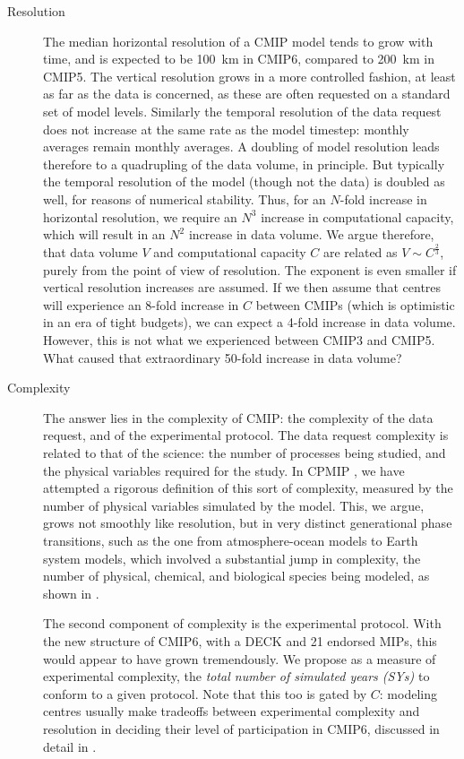 \documentclass[gmd,manuscript]{copernicus}
\newcommand{\bibref}[1] { \cite{ref:#1}}
\newcommand{\pipref}[1] {\citep{ref:#1}}
\begin{document}
\begin{description}
\item[Resolution] The median horizontal resolution of a CMIP model
  tends to grow with time, and is expected to be 100~km in CMIP6,
  compared to 200~km in CMIP5. The vertical resolution grows in a more
  controlled fashion, at least as far as the data is concerned, as
  these are often requested on a standard set of model levels.
  Similarly the temporal resolution of the data request does not
  increase at the same rate as the model timestep: monthly averages
  remain monthly averages. A doubling of model resolution leads
  therefore to a quadrupling of the data volume, in principle. But
  typically the temporal resolution of the model (though not the data)
  is doubled as well, for reasons of numerical stability. Thus, for an
  $N$-fold increase in horizontal resolution, we require an $N^3$
  increase in computational capacity, which will result in an $N^2$
  increase in data volume. We argue therefore, that data volume $V$ and
  computational capacity $C$ are related as $V \sim C^\frac23$, purely
  from the point of view of resolution. The exponent is even smaller
  if vertical resolution increases are assumed. If we then assume that
  centres will experience an 8-fold increase in $C$ between CMIPs
  (which is optimistic in an era of tight budgets), we can expect a
  4-fold increase in data volume. However, this is not what we
  experienced between CMIP3 and CMIP5. What caused that extraordinary
  50-fold increase in data volume?
\item[Complexity] The answer lies in the complexity of CMIP: the
  complexity of the data request, and of the experimental protocol.
  The data request complexity is related to that of the science: the
  number of processes being studied, and the physical variables
  required for the study. In CPMIP \pipref{balajietal2017}, we have
  attempted a rigorous definition of this sort of complexity, measured
  by the number of physical variables simulated by the model. This, we
  argue, grows not smoothly like resolution, but in very distinct
  generational phase transitions, such as the one from
  atmosphere-ocean models to Earth system models, which involved a
  substantial jump in complexity, the number of physical, chemical,
  and biological species being modeled, as shown in
  \bibref{balajietal2017}.

  The second component of complexity is the experimental protocol.
  With the new structure of CMIP6, with a DECK and 21 endorsed MIPs,
  this would appear to have grown tremendously. We propose as a
  measure of experimental complexity, the \emph{total number of
    simulated years (SYs)} to conform to a given protocol. Note that
  this too is gated by $C$: modeling centres usually make tradeoffs
  between experimental complexity and resolution in deciding their
  level of participation in CMIP6, discussed in detail in
  \bibref{balajietal2017}.
\end{description}
\end{document}
